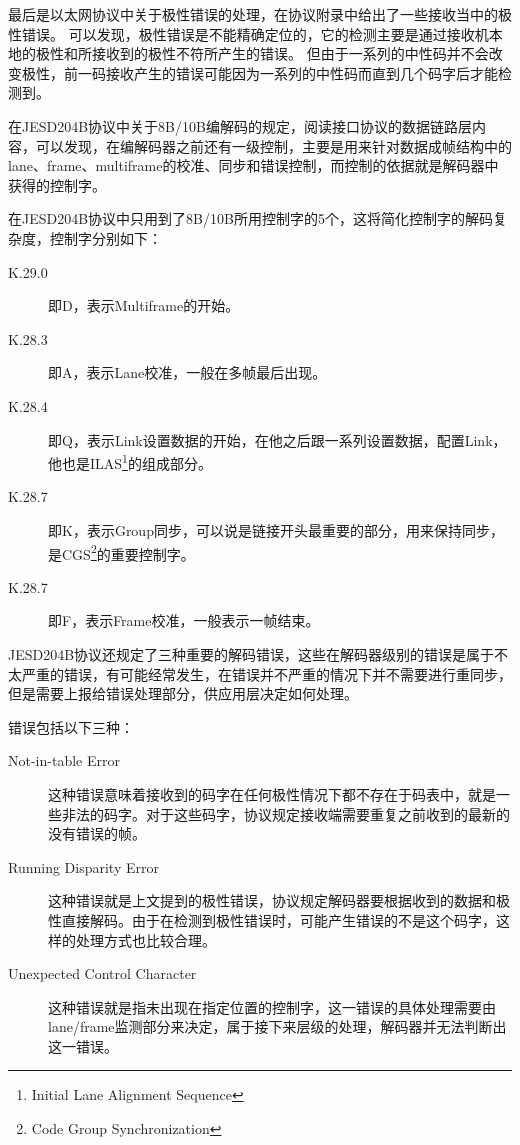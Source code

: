 \documentclass[UTF8]{ctexart}
\begin{document}
最后是以太网协议中关于极性错误的处理，在协议附录中给出了一些接收当中的极性错误。
可以发现，极性错误是不能精确定位的，它的检测主要是通过接收机本地的极性和所接收到的极性不符所产生的错误。
但由于一系列的中性码并不会改变极性，前一码接收产生的错误可能因为一系列的中性码而直到几个码字后才能检测到。

在JESD204B协议中关于8B/10B编解码的规定，阅读接口协议的数据链路层内容，可以发现，在编解码器之前还有一级控制，主要是用来针对数据成帧结构中的lane、frame、multiframe的校准、同步和错误控制，而控制的依据就是解码器中获得的控制字。

在JESD204B协议中只用到了8B/10B所用控制字的5个，这将简化控制字的解码复杂度，控制字分别如下：

\begin{description}
\item[K.29.0] 即D，表示Multiframe的开始。
\item[K.28.3] 即A，表示Lane校准，一般在多帧最后出现。
\item[K.28.4] 即Q，表示Link设置数据的开始，在他之后跟一系列设置数据，配置Link，他也是ILAS\footnote{Initial Lane Alignment Sequence}的组成部分。
\item[K.28.7] 即K，表示Group同步，可以说是链接开头最重要的部分，用来保持同步，是CGS\footnote{Code Group Synchronization}的重要控制字。
\item[K.28.7] 即F，表示Frame校准，一般表示一帧结束。
\end{description}

JESD204B协议还规定了三种重要的解码错误，这些在解码器级别的错误是属于不太严重的错误，有可能经常发生，在错误并不严重的情况下并不需要进行重同步，但是需要上报给错误处理部分，供应用层决定如何处理。

错误包括以下三种：

\begin{description}
\item[Not-in-table Error] 这种错误意味着接收到的码字在任何极性情况下都不存在于码表中，就是一些非法的码字。对于这些码字，协议规定接收端需要重复之前收到的最新的没有错误的帧。
\item[Running Disparity Error] 这种错误就是上文提到的极性错误，协议规定解码器要根据收到的数据和极性直接解码。由于在检测到极性错误时，可能产生错误的不是这个码字，这样的处理方式也比较合理。
\item[Unexpected Control Character] 这种错误就是指未出现在指定位置的控制字，这一错误的具体处理需要由lane/frame监测部分来决定，属于接下来层级的处理，解码器并无法判断出这一错误。
\end{description}
\end{document}

